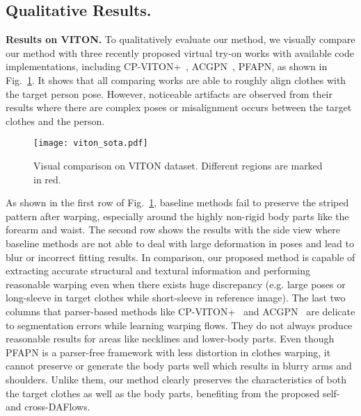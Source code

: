 \documentclass[runningheads]{llncs}
\begin{document}
\subsection{Qualitative Results.}
\textbf{Results on VITON.} To qualitatively evaluate our method, we visually compare our method with three recently proposed virtual try-on works with available code implementations, including CP-VITON+~\cite{cpvtonplus}, ACGPN~\cite{AGCPN}, PFAPN\cite{ge2021parser}, as shown in Fig.~\ref{viton}. It shows that all comparing works are able to roughly align clothes with the target person pose. However, noticeable artifacts are observed from their results where there are complex poses or misalignment occurs between the target clothes and the person.


 \begin{figure}[t]
\centering
\texttt{[image: viton\_sota.pdf]}

   \caption{Visual comparison on VITON dataset. Different regions are marked in red.\label{viton}}

\end{figure}

As shown in the first row of Fig.~\ref{viton}, baseline methods fail to preserve the striped pattern after warping, especially around the highly non-rigid body parts like the forearm and waist. The second row shows the results with the side view where baseline methods are not able to deal with large deformation in poses and lead to blur or incorrect fitting results. In comparison, our proposed method is capable of extracting accurate structural and textural information and performing reasonable warping even when there exists huge discrepancy (e.g. large poses or long-sleeve in target clothes while short-sleeve in reference image). The last two columns that parser-based methods like CP-VITON+~\cite{cpvtonplus} and ACGPN~\cite{AGCPN} are delicate to segmentation errors while learning warping flows. They do not always produce reasonable results for areas like necklines and lower-body parts. Even though PFAPN is a parser-free framework with less distortion in clothes warping, it cannot preserve or generate the body parts well which results in blurry arms and shoulders. Unlike them, our method clearly preserves the characteristics of both the target clothes as well as the body parts, benefiting from the proposed self- and cross-DAFlows.
\end{document}
